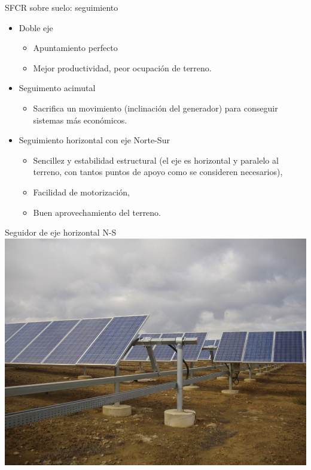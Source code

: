 \documentclass[xcolor={usenames,svgnames,dvipsnames}]{beamer}
\begin{document}
\begin{frame}[label=sec-1-3-5]{SFCR sobre suelo: seguimiento}
\begin{itemize}
\item \alert{Doble eje}

\begin{itemize}
\item Apuntamiento \guillemotleft{}perfecto\guillemotright{}

\item Mejor productividad, peor ocupación de terreno.
\end{itemize}

\item \alert{Seguimento acimutal}

\begin{itemize}
\item Sacrifica un movimiento (inclinación del generador) para conseguir
sistemas más económicos.
\end{itemize}

\item \alert{Seguimiento horizontal con eje Norte-Sur}

\begin{itemize}
\item Sencillez y estabilidad estructural (el eje es horizontal y
paralelo al terreno, con tantos puntos de apoyo como se consideren
necesarios),

\item Facilidad de motorización,

\item Buen aprovechamiento del terreno.
\end{itemize}
\end{itemize}
\end{frame}


\begin{frame}[label=sec-1-3-6]{Seguidor de eje horizontal N-S}
\includegraphics[width=.9\linewidth]{../figs/SeguidorEjeHorizontal.jpg}
\end{frame}
\end{document}
